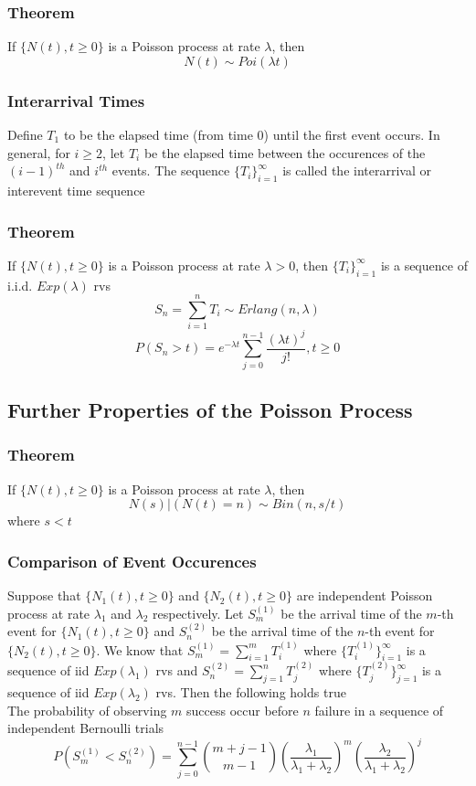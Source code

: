 \documentclass[11pt]{article}
\begin{document}
\subsubsection*{Theorem}
If $\{N(t),t\geq0\}$ is a Poisson process at rate $\lambda$, then 
\[N(t)\sim Poi(\lambda t)\]
\subsubsection{Interarrival Times}
Define $T_1$ to be the elapsed time (from time $0$) until the first event occurs. In general, for $i\geq2$, let $T_i$ be the elapsed time between 
the occurences of the $(i-1)^{th}$ and $i^{th}$ events. The sequence $\{T_i\}_{i=1}^{\infty}$ is called
the interarrival or interevent time sequence 
\subsubsection*{Theorem}
If $\{N(t),t\geq0\}$ is a Poisson process at rate $\lambda>0$, then $\{T_i\}_{i=1}^{\infty}$ is a sequence 
of i.i.d. $Exp(\lambda)$ rvs 
\[S_n = \sum_{i=1}^{n}T_i\sim Erlang(n,\lambda)\]
\[P(S_n>t) = e^{-\lambda t}\sum_{j=0}^{n-1}\frac{(\lambda t)^j}{j!}, t\geq 0\]
\subsection{Further Properties of the Poisson Process}
\subsubsection*{Theorem}
If $\{N(t),t\geq0\}$ is a Poisson process at rate $\lambda$, then 
\[N(s)|(N(t)=n)\sim Bin(n,s/t)\]
where $s<t$
\subsubsection{Comparison of Event Occurences}
Suppose that $\{N_1(t),t\geq0\}$ and $\{N_2(t),t\geq0\}$ are independent Poisson process at rate $\lambda_1$ and $\lambda_2$ respectively. 
Let $S_m^{(1)}$ be the arrival time of the $m$-th event for $\{N_1(t),t\geq0\}$ and $S_n^{(2)}$ be the arrival time of the $n$-th event for $\{N_2(t),t\geq0\}$. 
We know that $S_m^{(1)} = \sum_{i=1}^{m}T_i^{(1)}$ where $\{T_i^{(1)}\}_{i=1}^{\infty}$ is a sequence of iid $Exp(\lambda_1)$ rvs and $S_n^{(2)} = \sum_{j=1}^{n}T_j^{(2)}$ where $\{T_j^{(2)}\}_{j=1}^{\infty}$ is a sequence of iid $Exp(\lambda_2)$ rvs. 
Then the following holds true\\
The probability of observing $m$ success occur before $n$ failure in a sequence of independent Bernoulli trials
\[P(S_m^{(1)}<S_n^{(2)}) = \sum_{j=0}^{n-1}\binom{m+j-1}{m-1}\left(\frac{\lambda_1}{\lambda_1+\lambda_2}\right)^m\left(\frac{\lambda_2}{\lambda_1+\lambda_2}\right)^j\]
\end{document}
